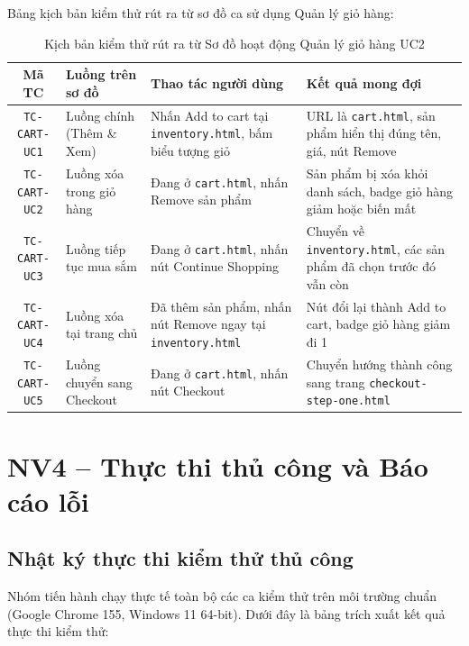 \documentclass[a4paper]{article}
\begin{document}
Bảng kịch bản kiểm thử rút ra từ sơ đồ ca sử dụng Quản lý giỏ hàng:
\begin{table}[H]
\centering
\small
\begin{tabularx}{\textwidth}{|c|p{3.5cm}|p{5cm}|X|}
\hline
\textbf{Mã TC} & \textbf{Luồng trên sơ đồ} & \textbf{Thao tác người dùng} & \textbf{Kết quả mong đợi} \\ \hline
\texttt{TC-CART-UC1} & Luồng chính (Thêm \& Xem) & Nhấn Add to cart tại \texttt{inventory.html}, bấm biểu tượng giỏ & URL là \texttt{cart.html}, sản phẩm hiển thị đúng tên, giá, nút Remove \\ \hline
\texttt{TC-CART-UC2} & Luồng xóa trong giỏ hàng & Đang ở \texttt{cart.html}, nhấn Remove sản phẩm & Sản phẩm bị xóa khỏi danh sách, badge giỏ hàng giảm hoặc biến mất \\ \hline
\texttt{TC-CART-UC3} & Luồng tiếp tục mua sắm & Đang ở \texttt{cart.html}, nhấn nút Continue Shopping & Chuyển về \texttt{inventory.html}, các sản phẩm đã chọn trước đó vẫn còn \\ \hline
\texttt{TC-CART-UC4} & Luồng xóa tại trang chủ & Đã thêm sản phẩm, nhấn nút Remove ngay tại \texttt{inventory.html} & Nút đổi lại thành Add to cart, badge giỏ hàng giảm đi 1 \\ \hline
\texttt{TC-CART-UC5} & Luồng chuyển sang Checkout & Đang ở \texttt{cart.html}, nhấn nút Checkout & Chuyển hướng thành công sang trang \texttt{checkout-step-one.html} \\ \hline
\end{tabularx}
\caption{Kịch bản kiểm thử rút ra từ Sơ đồ hoạt động Quản lý giỏ hàng UC2}
\end{table}


\clearpage
\section{NV4 – Thực thi thủ công và Báo cáo lỗi}
\subsection{Nhật ký thực thi kiểm thử thủ công}
Nhóm tiến hành chạy thực tế toàn bộ các ca kiểm thử trên môi trường chuẩn (Google Chrome 155, Windows 11 64-bit). Dưới đây là bảng trích xuất kết quả thực thi kiểm thử:
\end{document}
